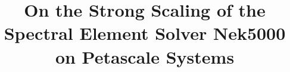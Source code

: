 \documentclass{sig-alternate}
\begin{document}






%

\title{On the Strong Scaling of the Spectral Element Solver Nek5000 on Petascale Systems}
%
%
%
%
%
\end{document}
